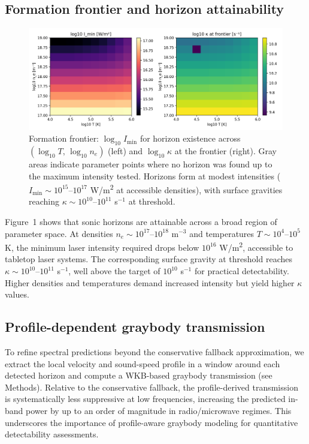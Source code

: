 \documentclass[11pt]{article}
\begin{document}
\subsection{Formation frontier and horizon attainability}
\begin{figure}[h]
  \centering
  \includegraphics[width=0.95\linewidth]{figures/formation_frontier.png}
  \caption{Formation frontier: $\log_{10} I_{\min}$ for horizon existence across $(\log_{10} T,\, \log_{10} n_e)$ (left) and $\log_{10} \kappa$ at the frontier (right). Gray areas indicate parameter points where no horizon was found up to the maximum intensity tested. Horizons form at modest intensities ($I_{\min} \sim 10^{15}$--$10^{17}$ \si{W/m^2} at accessible densities), with surface gravities reaching $\kappa \sim 10^{10}$--$10^{11}$ s$^{-1}$ at threshold.}
\end{figure}

Figure~1 shows that sonic horizons are attainable across a broad region of parameter space. At densities $n_e \sim 10^{17}$--$10^{18}$ m$^{-3}$ and temperatures $T \sim 10^4$--$10^5$ K, the minimum laser intensity required drops below $10^{16}$ \si{W/m^2}, accessible to tabletop laser systems. The corresponding surface gravity at threshold reaches $\kappa \sim 10^{10}$--$10^{11}$ s$^{-1}$, well above the target of $10^{10}$ s$^{-1}$ for practical detectability. Higher densities and temperatures demand increased intensity but yield higher $\kappa$ values.

\subsection{Profile-dependent graybody transmission}
To refine spectral predictions beyond the conservative fallback approximation, we extract the local velocity and sound-speed profile in a window around each detected horizon and compute a WKB-based graybody transmission (see Methods). Relative to the conservative fallback, the profile-derived transmission is systematically less suppressive at low frequencies, increasing the predicted in-band power by up to an order of magnitude in radio/microwave regimes. This underscores the importance of profile-aware graybody modeling for quantitative detectability assessments.
\end{document}
